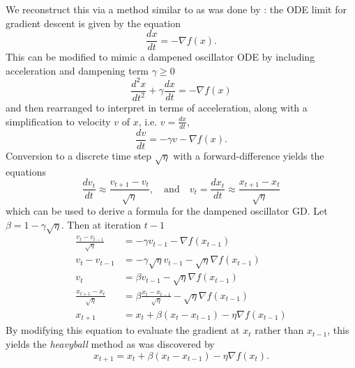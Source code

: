 \documentclass{article}
\newcommand{\dv}[2]{\frac{d #1}{d #2}}
\theoremstyle{definition}
\begin{document}
We reconstruct this via a method similar to as was done by
\citeauthor{10.1214/18-EJS1395}: the ODE limit for gradient descent is given by
the equation
\begin{equation}
    \dv{x}{t} = -\nabla f(x).
\end{equation}
This can be modified to mimic a dampened oscillator ODE by including acceleration
and dampening term $\gamma \geq 0$
\begin{equation}
    \dv{^2 x}{t^2}  + \gamma \dv{x}{t} = -\nabla f(x)
\end{equation}
and then rearranged to interpret in terms of acceleration, along with a
simplification to velocity $v$ of $x$, i.e.  $v = \dv{x}{t}$,
\begin{equation}
    \dv{v}{t}  =  -\gamma v -\nabla f(x).
\end{equation}
Conversion to a discrete time step $\sqrt{\eta}$ with a forward-difference yields the equations
\begin{equation}
    \label{eq:der}
    \dv{v_t}{t} \approx \frac{v_{t + 1} - v_t}{\sqrt{\eta}}, \quad \text{and}
    \quad v_{t} = \dv{x_t}{t} \approx \frac{x_{t + 1} - x_t}{\sqrt{\eta}}
\end{equation}
which can be used to derive a formula for the dampened oscillator GD. Let $\beta
= 1 - \gamma \sqrt{\eta}$. Then at iteration $t - 1$
\begin{equation}
    \label{eq:formula}
    \begin{aligned}
        \frac{v_{t} - v_{t - 1}}{\sqrt{\eta}} &= -\gamma v_{t - 1} -\nabla
        f(x_{t - 1}) \\
        v_{t} - v_{t - 1} &= -\gamma\sqrt\eta v_{t - 1} -\sqrt \eta \nabla
        f(x_{t - 1}) \\
        v_{t} &= \beta v_{t - 1} - \sqrt{\eta} \nabla f(x_{t - 1})\\
        \frac{x_{t + 1} - x_t}{\sqrt{\eta}} &= \beta \frac{x_{t}
        - x_{t - 1}}{\sqrt{\eta}} - \sqrt{\eta} \nabla f(x_{t - 1}) \\
        x_{t + 1} &= x_t + \beta (x_{t} - x_{t - 1}) - \eta \nabla f(x_{t - 1})
    \end{aligned}
\end{equation}
By modifying this equation to evaluate the gradient at $x_t$ rather
than $x_{t - 1}$, this yields the \emph{heavyball} method as was discovered by
\citeauthor{heavyball}
\begin{equation}
    \label{eq:heavyball}
        x_{t + 1} = x_t + \beta (x_{t} - x_{t - 1}) - \eta \nabla f(x_t).
\end{equation}
\end{document}
